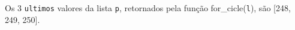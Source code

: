 \documentclass[12pt,varwidth=16cm,border=1pt]{standalone}
\begin{document}
Os 3 \verb+ultimos+ valores da lista \verb+p+, retornados pela função for\_cicle(\verb+l+), são [248, 249, 250].

\questiomtrue
\end{document}
